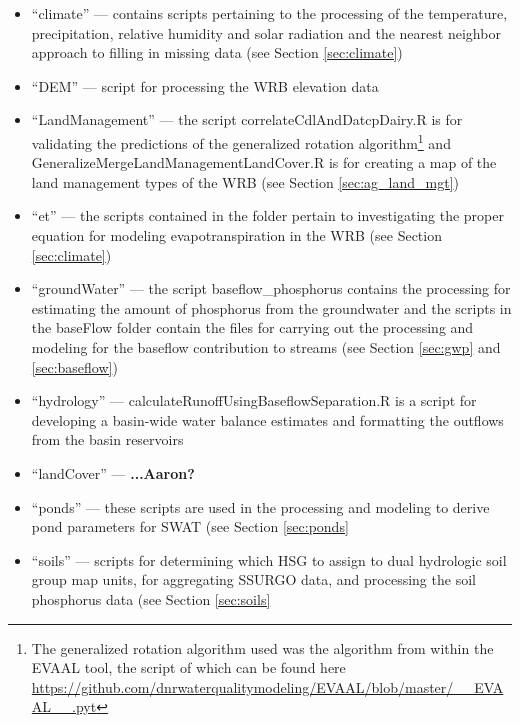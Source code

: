 \begin{itemize}
\item ``climate'' --- contains scripts pertaining to the processing of the temperature, precipitation, relative humidity and solar radiation and the nearest neighbor approach to filling in missing data (see Section \ref{sec:climate})

\item ``DEM'' --- script for processing the WRB elevation data

\item ``LandManagement'' --- the script correlateCdlAndDatcpDairy.R is for validating the predictions of the generalized rotation algorithm\footnote{The generalized rotation algorithm used was the algorithm from within the EVAAL tool, the script of which can be found here \url{https://github.com/dnrwaterqualitymodeling/EVAAL/blob/master/__EVAAL__.pyt}} and GeneralizeMergeLandManagementLandCover.R is for creating a map of the land management types of the WRB (see Section \ref{sec:ag_land_mgt})

\item ``et'' --- the scripts contained in the folder pertain to investigating the proper equation for modeling evapotranspiration in the WRB (see Section \ref{sec:climate})

\item ``groundWater'' --- the script baseflow\_phosphorus contains the processing for estimating the amount of phosphorus from the groundwater and the scripts in the baseFlow folder contain the files for carrying out the processing and modeling for the baseflow contribution to streams (see Section \ref{sec:gwp} and \ref{sec:baseflow})

\item ``hydrology'' --- calculateRunoffUsingBaseflowSeparation.R is a script for developing a basin-wide water balance estimates and formatting the outflows from the basin reservoirs

\item ``landCover'' --- {\bf...Aaron?}

\item ``ponds'' --- these scripts are used in the processing and modeling to derive pond parameters for SWAT (see Section \ref{sec:ponds} 

\item ``soils'' --- scripts for determining which HSG to assign to dual hydrologic soil group map units, for aggregating SSURGO data, and processing the soil phosphorus data  (see Section \ref{sec:soils} 


\end{itemize}
